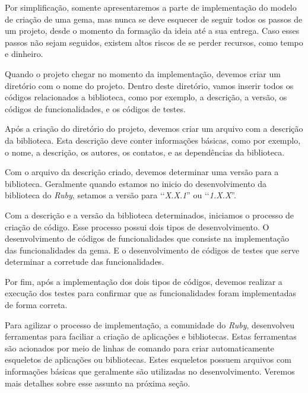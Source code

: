 Por simplificação, somente apresentaremos a parte de implementação do modelo de criação de uma
gema, mas nunca se deve esquecer de seguir todos os passos de um projeto, desde o momento da formação da
ideia até a sua entrega. Caso esses passos não sejam seguidos, existem altos riscos de se perder recursos,
como tempo e dinheiro.

Quando o projeto chegar no momento da implementação, devemos criar um diretório com o nome do projeto.
Dentro deste diretório, vamos inserir todos os códigos relacionados a biblioteca, como por exemplo, a
descrição, a versão, os códigos de funcionalidades, e os códigos de testes.

Após a criação do diretório do projeto, devemos criar um arquivo com a descrição da biblioteca. Esta
descrição deve conter informações básicas, como por exemplo, o nome, a descrição, os autores, os
contatos, e as dependências da biblioteca.

Com o arquivo da descrição criado, devemos determinar uma versão para a biblioteca. Geralmente quando
estamos no inicio do desenvolvimento da biblioteca do \emph{Ruby}, setamos a versão para
‘‘\emph{X.X.1}'' ou ‘‘\emph{1.X.X}''.

Com a descrição e a versão da biblioteca determinados, iniciamos o processo de criação de código.
Esse processo possui dois tipos de desenvolvimento. O desenvolvimento de códigos de
funcionalidades que consiste na implementação das funcionalidades da gema. E o desenvolvimento
de códigos de testes que serve determinar a corretude das funcionalidades.

Por fim, após a implementação dos dois tipos de códigos, devemos realizar a execução dos testes
para confirmar que as funcionalidades foram implementadas de forma correta.

Para agilizar o processo de implementação, a comunidade do \emph{Ruby}, desenvolveu ferramentas para
faciliar a criação de aplicações e bibliotecas. Estas ferramentas são acionados por meio de
linhas de comando para criar automaticamente esqueletos de aplicações ou bibliotecas. Estes esqueletos
possuem arquivos com informações básicas que geralmente são utilizadas no desenvolvimento. Veremos
mais detalhes sobre esse assunto na próxima seção.

